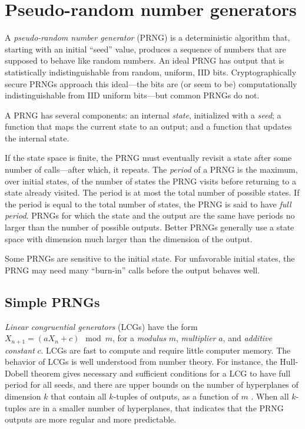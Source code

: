 \documentclass[graybox]{svmult}
\begin{document}
\section{Pseudo-random number generators}
\label{sec:prngs}

A \emph{pseudo-random number generator} (PRNG) is a deterministic algorithm that, starting with
an initial ``seed'' value, produces a sequence of numbers that are supposed to behave like 
random numbers.
An ideal PRNG has output that is statistically indistinguishable from random, uniform, IID bits. 
Cryptographically secure PRNGs approach this ideal---the bits are (or seem to be) computationally 
indistinguishable from IID uniform bits---but common PRNGs do not.

A PRNG has several components:
an internal \emph{state}, initialized with a \emph{seed};
a function that maps the current state to an output;
and a function that updates the internal state.

If the state space is finite, the PRNG must eventually revisit a state after some number of calls---after 
which, it repeats.
The \emph{period} of a PRNG is the maximum, over initial states, of the number of states 
the PRNG visits before returning to a state already visited.
The period is at most the total number of possible states.
If the period is equal to the total number of states, the PRNG is said to have \emph{full period}.
PRNGs for which the state and the output are the same have periods no larger than the number of possible outputs.
Better PRNGs generally use a state space with dimension much larger than the dimension of the output.

Some PRNGs are sensitive to the initial state.
For unfavorable initial states, the PRNG may need many ``burn-in'' calls before the output behaves well.

\subsection{Simple PRNGs}



\emph{Linear congruential generators} (LCGs) have the form $X_{n+1} = (a X_n + c) \mod m$, for a 
\emph{modulus} $m$, \emph{multiplier} $a$, and \emph{additive constant} $c$.
LCGs are fast to compute and require little computer memory.
The behavior of LCGs is well understood from number theory.
For instance, the Hull-Dobell theorem \cite{hullDobell62}
gives necessary and sufficient conditions for a LCG to have full period for all seeds,
and there are upper bounds on the number of hyperplanes of dimension $k$
that contain all $k$-tuples of outputs, as a function of $m$ \cite{marsaglia_random_1968}.
When all $k$-tuples are in a smaller number of hyperplanes, that indicates that
the PRNG outputs are more regular and more predictable.
\end{document}
